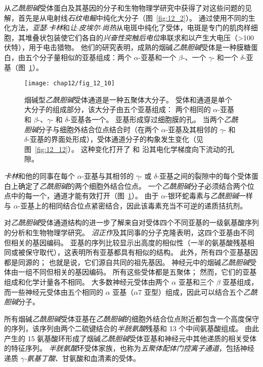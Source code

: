 从\textit{乙酰胆碱}受体蛋白及其基因的分子和生物物理学研究中获得了对这些问题的见解，首先是从电射线\textit{石纹电鳐}中纯化大分子（图~\ref{fig:12_2}）。
通过使用不同的生化方法，\textit{亚瑟$\cdot$卡林}和\textit{让$\cdot$皮埃尔$\cdot$尚热}从电斑中纯化了受体，电斑是专门的肌肉样细胞，其堆叠状包装使它们各自的\textit{兴奋性突触后电位}串联求和以产生大电压（>100 伏特），用于电击猎物。
他们的研究表明，成熟的烟碱\textit{乙酰胆碱}受体是一种膜糖蛋白，由五个分子量相似的亚基组成：两个 $\alpha$-亚基和一个 $\beta$-、一个 $\gamma$- 和一个 $\delta$-亚基（图~\ref{fig:12_10}）。


\begin{figure}[htbp]
	\centering
	\texttt{[image: chap12/fig\_12\_10]}
	\caption{烟碱型\textit{乙酰胆碱}受体通道是一种五聚体大分子。
		受体和通道是单个大分子的组成部分，该大分子由五个亚基组成：
		两个相同的 $\alpha$-亚基和 $\beta$-、$\gamma$- 和 $\delta$-亚基各一个。
		亚基形成穿过细胞膜的孔。
		当两个\textit{乙酰胆碱}分子与细胞外结合位点结合时（在两个 $\alpha$-亚基及其相邻的 $\gamma$- 和 $\delta$-亚基的界面处形成），受体通道分子的构象发生变化（见图~\ref{fig:12_12}）。
		这种变化打开了  和  沿其电化学梯度向下流动的孔隙。}
	\label{fig:12_10}
\end{figure}


\textit{卡林}和他的同事在每个 $\alpha$-亚基与其相邻的 $\gamma$- 或 $\delta$-亚基之间的裂隙中的每个受体蛋白上确定了\textit{乙酰胆碱}的两个细胞外结合位点。
一个\textit{乙酰胆碱}分子必须结合两个位点中的每一个，通道才能有效打开（图~\ref{fig:12_10}）。
由于 $\alpha$-银环蛇毒素与\textit{乙酰胆碱}一样与 $\alpha$-亚基上的相同结合位点紧密结合，因此该毒素充当不可逆的递质拮抗剂。


对\textit{乙酰胆碱}受体通道结构的进一步了解来自对受体四个不同亚基的一级氨基酸序列的分析和生物物理学研究。
\textit{沼正作}及其同事的分子克隆表明，这四个亚基由不同但相关的基因编码。
亚基的序列比较显示出高度的相似性（一半的氨基酸残基相同或被保守取代），这表明所有亚基都具有相似的结构。 
此外，所有四个亚基基因都是同源的；
也就是说，它们源自共同的祖先基因。
神经元中的烟碱\textit{乙酰胆碱}受体由一组不同但相关的基因编码。
所有这些受体都是五聚体；
然而，它们的亚基组成和化学计量各不相同。
大多数神经元受体由两个 $\alpha$ 亚基和三个 $\beta$ 亚基组成，而一些神经元受体由五个相同的 $\alpha$ 亚基（$\alpha$7 亚型）组成，因此可以结合五个\textit{乙酰胆碱}分子。


所有烟碱\textit{乙酰胆碱}受体亚基在\textit{乙酰胆碱}的细胞外结合位点附近都包含一个高度保守的序列，该序列由两个二硫键结合的\textit{半胱氨酸}残基和 13 个中间氨基酸组成。
由此产生的 15 氨基酸环形成了烟碱\textit{乙酰胆碱}受体亚基和神经元中其他递质的相关受体的特征序列。
\textit{半胱氨酸}环受体家族，也称为\textit{五聚体配体门控离子通道}，包括神经递质 \textit{$\gamma$-氨基丁酸}、甘氨酸和血清素的受体。


